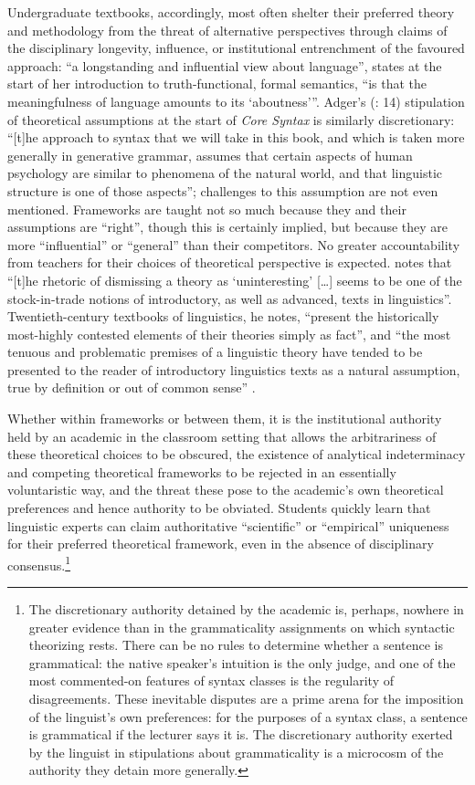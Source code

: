 \documentclass[output=paper]{langscibook}
\begin{document}
Undergraduate textbooks, accordingly, most often shelter their preferred theory and methodology from the threat of alternative perspectives through claims of the disciplinary longevity, influence, or institutional entrenchment of the favoured approach: ``a longstanding and influential view about language'', states \citet[6]{Kearns2008} at the start of her introduction to truth-functional, formal semantics, ``is that the meaningfulness of language amounts to its `aboutness'\thinspace''. Adger's (\citeyear{Adger2003}: 14) stipulation of theoretical assumptions at the start of \emph{Core Syntax} is similarly discretionary: ``[t]he approach to syntax that we will take in this book, and which is taken more generally in generative grammar, assumes that certain aspects of human psychology are similar to phenomena of the natural world, and that linguistic structure is one of those aspects''; challenges to this assumption are not even mentioned. Frameworks are taught not so much because they and their assumptions are ``right'', though this is certainly implied, but because they are more ``influential'' or ``general'' than their competitors. No greater accountability from teachers for their choices of theoretical perspective is expected. \citet[9]{Lawson2001} notes that ``[t]he rhetoric of dismissing a theory as `uninteresting' […] seems to be one of the stock-in-trade notions of introductory, as well as advanced, texts in linguistics''. Twentieth-century textbooks of linguistics, he notes, ``present the historically most-highly contested elements of their theories simply as fact'', and ``the most tenuous and problematic premises of a linguistic theory have tended to be presented to the reader of introductory linguistics texts as a natural assumption, true by definition or out of common sense'' \citep[12]{Lawson2001}.

Whether within frameworks or between them, it is the institutional authority held by an academic in the classroom setting that allows the arbitrariness of these theoretical choices to be obscured, the existence of analytical indeterminacy and competing theoretical frameworks to be rejected in an essentially voluntaristic way, and the threat these pose to the academic's own theoretical preferences and hence authority to be obviated. Students quickly learn that linguistic experts can claim authoritative ``scientific'' or ``empirical'' uniqueness for their preferred theoretical framework, even in the absence of disciplinary consensus.\footnote{The discretionary authority detained by the academic is, perhaps, nowhere in greater evidence than in the grammaticality assignments on which syntactic theorizing rests. There can be no rules to determine whether a sentence is grammatical: the native speaker's intuition is the only judge, and one of the most commented-on features of syntax classes is the regularity of disagreements. These inevitable disputes are a prime arena for the imposition of the linguist's own preferences: for the purposes of a syntax class, a sentence is grammatical if the lecturer says it is. The discretionary authority exerted by the linguist in stipulations about grammaticality is a microcosm of the authority they detain more generally.}
\end{document}
